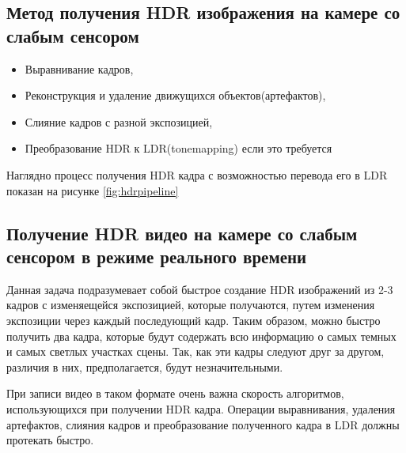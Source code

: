 \subsection { Метод получения HDR изображения на камере со слабым сенсором}
\begin{itemize}
    \item Выравнивание кадров,
    \item Реконструкция и удаление движущихся объектов(артефактов),
    \item Слияние кадров с разной экспозицией,
    \item Преобразование HDR к LDR(tonemapping) если это требуется
\end{itemize}

Наглядно процесс получения HDR кадра с возможностью перевода его в LDR\cite{bib3} показан на рисунке \ref{fig:hdrpipeline}

\begin{figure}[ht!]
\end{figure}

\subsection{ Получение HDR видео на камере со слабым сенсором в режиме реального времени}
    
    Данная задача подразумевает собой быстрое создание HDR изображений из 2-3 кадров с изменяещейся экспозицией, которые получаются, путем изменения экспозиции через каждый последующий кадр. Таким образом, можно быстро получить два кадра, которые будут содержать всю информацию о самых темных и самых светлых участках сцены. Так, как эти кадры следуют друг за другом, различия в них, предполагается, будут незначительными.

    При записи видео в таком формате очень важна скорость алгоритмов, использующихся при получении HDR кадра. Операции выравнивания, удаления артефактов, слияния кадров и преобразование полученного кадра в LDR должны протекать быстро.

